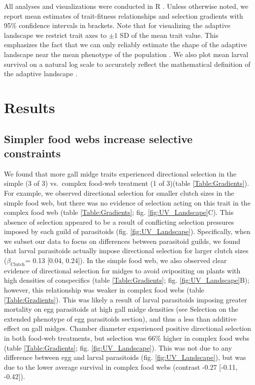 \documentclass[11pt,]{article}
\begin{document}
All analyses and visualizations were conducted in R \citep{R2018}.
Unless otherwise noted, we report mean estimates of trait-fitness
relationships and selection gradients with 95\% confidence intervals in
brackets. Note that for visualizing the adaptive landscape we restrict
trait axes to \(\pm 1\) SD of the mean trait value. This emphasizes the
fact that we can only reliably estimate the shape of the adaptive
landscape near the mean phenotype of the population \citep{Arnold2001}.
We also plot mean larval survival on a natural log scale to accurately
reflect the mathematical definition of the adaptive landscape
\citep{Arnold2003}.

\section{Results}\label{results}

\subsection{Simpler food webs increase selective
constraints}\label{simpler-food-webs-increase-selective-constraints}

\indent We found that more gall midge traits experienced directional
selection in the simple (3 of 3) vs.~complex food-web treatment (1 of
3)(table \ref{Table:Gradients}). For example, we observed directional
selection for smaller clutch sizes in the simple food web, but there was
no evidence of selection acting on this trait in the complex food web
(table \ref{Table:Gradients}; fig. \ref{fig:UV_Landscape}C). This
absence of selection appeared to be a result of conflicting selection
pressures imposed by each guild of parasitoids (fig.
\ref{fig:UV_Landscape}). Specifically, when we subset our data to focus
on differences between parasitoid guilds, we found that larval
parasitoids actually impose directional selection for larger clutch
sizes (\(\beta_{\text{Clutch}}\)= 0.13 {[}0.04, 0.24{]}). In the simple
food web, we also observed clear evidence of directional selection for
midges to avoid ovipositing on plants with high densities of
conspecifics (table \ref{Table:Gradients}; fig.
\ref{fig:UV_Landscape}B); however, this relationship was weaker in
complex food webs (table \ref{Table:Gradients}). This was likely a
result of larval parasitoids imposing greater mortality on egg
parasitoids at high gall midge densities (see Selection on the extended
phenotype of egg parasitoids section), and thus a less than additive
effect on gall midges. Chamber diameter experienced positive directional
selection in both food-web treatments, but selection was 66\% higher in
complex food webs (table \ref{Table:Gradients}; fig.
\ref{fig:UV_Landscape}). This was not due to any difference between egg
and larval parasitoids (fig. \ref{fig:UV_Landscape}), but was due to the
lower average survival in complex food webs (contrast -0.27 {[}-0.11,
-0.42{]}).
\end{document}
